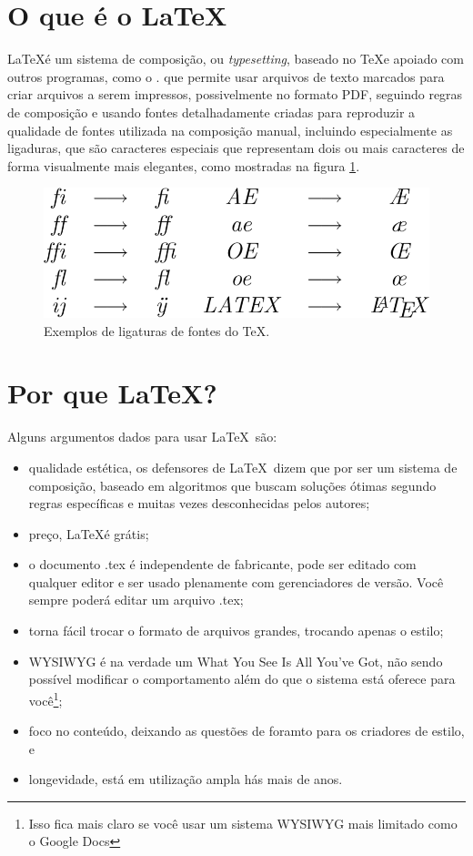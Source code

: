 \section{O que é o \LaTeX}

\LaTeX é um sistema de composição, ou \textit{typesetting}, baseado no \TeX e apoiado com outros programas, como o . que permite usar arquivos de texto marcados para criar arquivos a serem impressos, possivelmente no formato PDF,  seguindo regras de composição  e usando fontes detalhadamente criadas para reproduzir a qualidade de fontes utilizada na composição manual, incluindo especialmente as ligaduras, que são caracteres especiais que representam dois ou mais caracteres de forma visualmente mais elegantes, como mostradas na figura \ref{fig:ligatureslatex}.

\begin{figure}[hbt]
    \centering
    \includegraphics[width=0.7\linewidth]{Images/799px-LigaturesLatex}
    \caption[Exemplos de ligaturas de fontes do \TeX]{Exemplos de ligaturas de fontes do \TeX.}
    \label{fig:ligatureslatex}
\end{figure}

\section{Por que \LaTeX?}

Alguns argumentos dados para usar \LaTeX\  são:
\begin{itemize}
    \item qualidade estética, os defensores de \LaTeX\ dizem que por ser um sistema de composição, baseado em algoritmos que buscam soluções ótimas segundo regras específicas e muitas vezes desconhecidas pelos autores;
    \item preço, \LaTeX é grátis;
    \item o documento .tex é independente de fabricante, pode ser editado com qualquer editor e ser usado plenamente com gerenciadores de versão. Você sempre poderá editar um arquivo .tex;
    \item torna fácil trocar o formato de arquivos grandes, trocando apenas o estilo;
    \item WYSIWYG é na verdade um What You See Is All You've Got, não sendo possível modificar o comportamento além do que o sistema está oferece para você\footnote{Isso fica mais claro se você usar um sistema WYSIWYG mais limitado como o Google Docs};
    \item foco no conteúdo, deixando as questões de foramto para os criadores de estilo, e
    \item longevidade, está em utilização ampla hás mais de anos.
\end{itemize}

